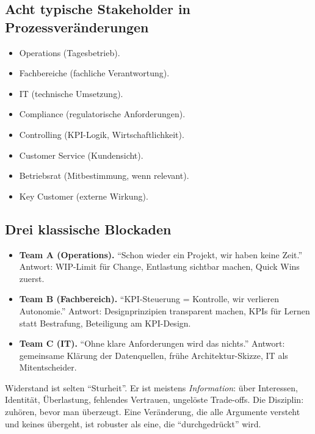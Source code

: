 \documentclass[11pt,a4paper,oneside]{article}
\begin{document}
\subsection{Acht typische Stakeholder in Prozessveränderungen}

\begin{itemize}
  \item Operations (Tagesbetrieb).
  \item Fachbereiche (fachliche Verantwortung).
  \item IT (technische Umsetzung).
  \item Compliance (regulatorische Anforderungen).
  \item Controlling (KPI-Logik, Wirtschaftlichkeit).
  \item Customer Service (Kundensicht).
  \item Betriebsrat (Mitbestimmung, wenn relevant).
  \item Key Customer (externe Wirkung).
\end{itemize}

\subsection{Drei klassische Blockaden}

\begin{itemize}
  \item \textbf{Team A (Operations).} ``Schon wieder ein Projekt, wir haben keine Zeit.'' Antwort: WIP-Limit für Change, Entlastung sichtbar machen, Quick Wins zuerst.
  \item \textbf{Team B (Fachbereich).} ``KPI-Steuerung = Kontrolle, wir verlieren Autonomie.'' Antwort: Designprinzipien transparent machen, KPIs für Lernen statt Bestrafung, Beteiligung am KPI-Design.
  \item \textbf{Team C (IT).} ``Ohne klare Anforderungen wird das nichts.'' Antwort: gemeinsame Klärung der Datenquellen, frühe Architektur-Skizze, IT als Mitentscheider.
\end{itemize}

\begin{merkbox}
Widerstand ist selten ``Sturheit''. Er ist meistens \emph{Information}: über Interessen, Identität, Überlastung, fehlendes Vertrauen, ungelöste Trade-offs. Die Disziplin: zuhören, bevor man überzeugt. Eine Veränderung, die alle Argumente versteht und keines übergeht, ist robuster als eine, die ``durchgedrückt'' wird.
\end{merkbox}
\end{document}
